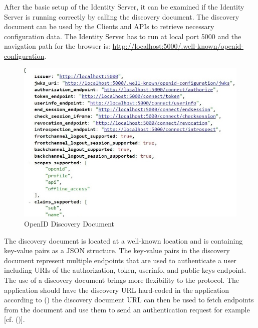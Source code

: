 After the basic setup of the Identity Server, it can be examined if the Identity Server is running correctly by calling the discovery document. The discovery document can be used by the Clients and APIs to retrieve necessary configuration data. The Identity Server has to run at local port 5000 and the navigation path for the browser is:
\url{http://localhost:5000/.well-known/openid-configuration}.

\begin{figure}[h]
	\centering
	\includegraphics[width=0.8\linewidth]{images/openid-discovery-document}
	\caption{OpenID Discovery Document}
	\label{fig:openid-discovery-document}
\end{figure}
The discovery document is located at a well-known location and is containing key-value pairs as a JSON structure. The key-value pairs in the discovery document represent multiple endpoints that are used to authenticate a user including URIs of the authorization, token, userinfo, and public-keys endpoint. The use of a discovery document brings more flexibility to the protocol. The application should have the discovery URL hard-coded in the application according to (\cite{Google:2018:IdentityPlatform}) the discovery document URL can then be used to fetch endpoints from the document and use them to send an authentication request for example [cf. (\cite{Google:2018:IdentityPlatform})].

